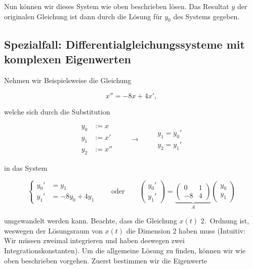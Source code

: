 Nun können wir dieses System wie oben beschrieben lösen. Das Resultat \( y \) der originalen Gleichung ist dann durch die Lösung für \( y_0 \) des Systems gegeben. 

\subsection{Spezialfall: Differentialgleichungssysteme mit komplexen Eigenwerten}

Nehmen wir Beispielsweise die Gleichung 

\begin{equation*}
    x'' = -8x + 4x',
    \label{eq:lin_diff}
\end{equation*}

welche sich durch die Substitution

\begin{equation*}
    \begin{aligned}
        y_0 &:= x \\
        y_1 &:= x' \\
        y_2 &:= x''         
    \end{aligned} \qquad \longrightarrow \qquad
    \begin{aligned}
        y_1 = y_0' \\
        y_2 = y_1' 
    \end{aligned}
\end{equation*}

in das System 

\begin{equation*}
    \left\{ \begin{aligned}
        y_0' &= y_1 \\
        y_1' &= -8y_0 + 4y_1
    \end{aligned} \right. \qquad \text{oder} \qquad
    \begin{pmatrix}
        y_0' \\
        y_1'
    \end{pmatrix} =
    \underbrace{\begin{pmatrix}
        0 & 1 \\
        -8 & 4
    \end{pmatrix}}_{A}
    \begin{pmatrix}
        y_0 \\
        y_1
    \end{pmatrix}
\end{equation*}

umgewandelt werden kann. Beachte, dass die Gleichung \( x(t) \) 2.\ Ordnung ist, weswegen der Lösungsraum von \( x(t) \) die Dimension 2 haben muss (Intuitiv: Wir müssen zweimal integrieren und haben deswegen zwei Integrationskonstanten). Um die allgemeine Lösung zu finden, können wir wie oben beschrieben vorgehen.  Zuerst bestimmen wir die Eigenwerte

